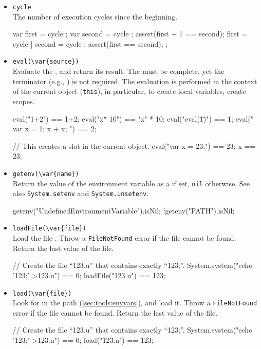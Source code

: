 \begin{itemize}
\item \lstinline|cycle|\experimental\\
  The number of execution cycles since the beginning.
\begin{urbiscript}
{
  var first = cycle ; var second = cycle ;
  assert(first + 1 == second);
  first = cycle | second = cycle ;
  assert(first == second);
};
\end{urbiscript}

\item \lstinline|eval(\var{source})|\\
  Evaluate the \us {}, and return its result.  The
   must be complete, yet the terminator (e.g., \samp{;})
  is not required.  The evaluation is performed in the context of the
  current object (\lstinline|this|), in particular, to create local
  variables, create scopes.
\begin{urbiassert}
eval("1+2") == 1+2;
eval("\"x\" * 10") == "x" * 10;
eval("eval(\"1\")") ==  1;
eval("{ var x = 1; x + x; }") ==  2;

// This creates a slot in the current object.
eval("var x = 23;") == 23;
x == 23;
\end{urbiassert}

\item \lstinline|getenv(\var{name})|\\
  Return the value of the environment variable  as a
   if set, \lstinline|nil| otherwise.  See also
  \lstinline|System.setenv| and \lstinline|System.unsetenv|.
\begin{urbiassert}
getenv("UndefinedEnvironmentVariable").isNil;
!getenv("PATH").isNil;
\end{urbiassert}

\item \lstinline|loadFile(\var{file})|\\
  Load the \us file .  Throw a \lstinline|FileNotFound|
  error if the file cannot be found.  Return the last value of the
  file.
\begin{urbiassert}
// Create the file ``123.u'' that contains exactly ``123;''.
System.system("echo '123;' >123.u") == 0;
loadFile("123.u") == 123;
\end{urbiassert}

\item \lstinline|load(\var{file})|\\
  Look for  in the \urbi path (\autoref{sec:tools:envvars}),
  and load it.  Throw a \lstinline|FileNotFound| error if the file
  cannot be found.  Return the last value of the file.
\begin{urbiassert}
// Create the file ``123.u'' that contains exactly ``123;''.
System.system("echo '123;' >123.u") == 0;
load("123.u") == 123;
\end{urbiassert}


\end{itemize}
